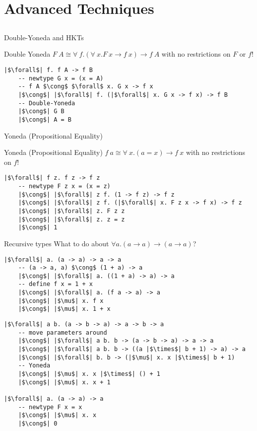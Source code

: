 \documentclass[tikz]{beamer}
\theoremstyle{definition}
\begin{document}
\section{Advanced Techniques}
\subsection{}
\begin{frame}[fragile]{Double-Yoneda and HKTs}
\begin{block}{Double Yoneda}
    $F~A \cong \forall~f. (\forall~x. F~x \to f~x) \to f~A$ with no restrictions on $F$ or $f$!
\end{block}
\begin{verbatim}
|$\forall$| f. f A -> f B
    -- newtype G x = (x = A)
    -- f A $\cong$ $\forall$ x. G x -> f x
    |$\cong$| |$\forall$| f. (|$\forall$| x. G x -> f x) -> f B
    -- Double-Yoneda
    |$\cong$| G B
    |$\cong$| A = B
\end{verbatim}
\end{frame}
\begin{frame}[fragile]{Yoneda (Propositional Equality)}
\begin{block}{Yoneda (Propositional Equality)}
    $f~a \cong \forall~x. (a = x) \to f~x$ with no restrictions on $f$!
\end{block}
\begin{verbatim}
|$\forall$| f z. f z -> f z
    -- newtype F z x = (x = z)
    |$\cong$| |$\forall$| z f. (1 -> f z) -> f z
    |$\cong$| |$\forall$| z f. (|$\forall$| x. F z x -> f x) -> f z
    |$\cong$| |$\forall$| z. F z z
    |$\cong$| |$\forall$| z. z = z
    |$\cong$| 1
\end{verbatim}
\end{frame}
\begin{frame}[fragile]{Recursive types}
What to do about $\forall a. (a \to a) \to (a \to a)$?
\end{frame}
\begin{frame}[fragile]
\begin{verbatim}
|$\forall$| a. (a -> a) -> a -> a
    -- (a -> a, a) $\cong$ (1 + a) -> a
    |$\cong$| |$\forall$| a. ((1 + a) -> a) -> a
    -- define f x = 1 + x
    |$\cong$| |$\forall$| a. (f a -> a) -> a
    |$\cong$| |$\mu$| x. f x
    |$\cong$| |$\mu$| x. 1 + x
\end{verbatim}
\end{frame}
\begin{frame}[fragile]
\begin{verbatim}
|$\forall$| a b. (a -> b -> a) -> a -> b -> a
    -- move parameters around
    |$\cong$| |$\forall$| a b. b -> (a -> b -> a) -> a -> a
    |$\cong$| |$\forall$| a b. b -> ((a |$\times$| b + 1) -> a) -> a
    |$\cong$| |$\forall$| b. b -> (|$\mu$| x. x |$\times$| b + 1)
    -- Yoneda
    |$\cong$| |$\mu$| x. x |$\times$| () + 1
    |$\cong$| |$\mu$| x. x + 1

|$\forall$| a. (a -> a) -> a
    -- newtype F x = x
    |$\cong$| |$\mu$| x. x
    |$\cong$| 0
\end{verbatim}
\end{frame}
\end{document}
